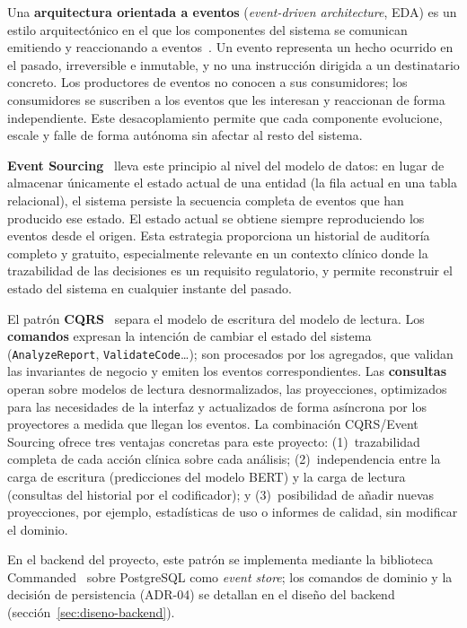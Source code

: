 Una \textbf{arquitectura orientada a eventos} (\emph{event-driven architecture}, EDA) es un estilo arquitectónico en el que los componentes del sistema se comunican emitiendo y reaccionando a eventos~\cite{Fowler02}. Un evento representa un hecho ocurrido en el pasado, irreversible e inmutable, y no una instrucción dirigida a un destinatario concreto. Los productores de eventos no conocen a sus consumidores; los consumidores se suscriben a los eventos que les interesan y reaccionan de forma independiente. Este desacoplamiento permite que cada componente evolucione, escale y falle de forma autónoma sin afectar al resto del sistema.

\textbf{Event Sourcing}~\cite{Young10} lleva este principio al nivel del modelo de datos: en lugar de almacenar únicamente el estado actual de una entidad (la fila actual en una tabla relacional), el sistema persiste la secuencia completa de eventos que han producido ese estado. El estado actual se obtiene siempre reproduciendo los eventos desde el origen. Esta estrategia proporciona un historial de auditoría completo y gratuito, especialmente relevante en un contexto clínico donde la trazabilidad de las decisiones es un requisito regulatorio, y permite reconstruir el estado del sistema en cualquier instante del pasado.

El patrón \textbf{CQRS}~\cite{Young10} separa el modelo de escritura del modelo de lectura. Los \textbf{comandos} expresan la intención de cambiar el estado del sistema (\texttt{AnalyzeReport}, \texttt{ValidateCode}…); son procesados por los agregados, que validan las invariantes de negocio y emiten los eventos correspondientes. Las \textbf{consultas} operan sobre modelos de lectura desnormalizados, las proyecciones, optimizados para las necesidades de la interfaz y actualizados de forma asíncrona por los proyectores a medida que llegan los eventos. La combinación CQRS/Event Sourcing ofrece tres ventajas concretas para este proyecto: (1)~trazabilidad completa de cada acción clínica sobre cada análisis; (2)~independencia entre la carga de escritura (predicciones del modelo BERT) y la carga de lectura (consultas del historial por el codificador); y (3)~posibilidad de añadir nuevas proyecciones, por ejemplo, estadísticas de uso o informes de calidad, sin modificar el dominio.

En el backend del proyecto, este patrón se implementa mediante la biblioteca Commanded~\cite{commanded2024} sobre PostgreSQL como \emph{event store}; los comandos de dominio y la decisión de persistencia (ADR-04) se detallan en el diseño del backend (sección~\ref{sec:diseno-backend}).

